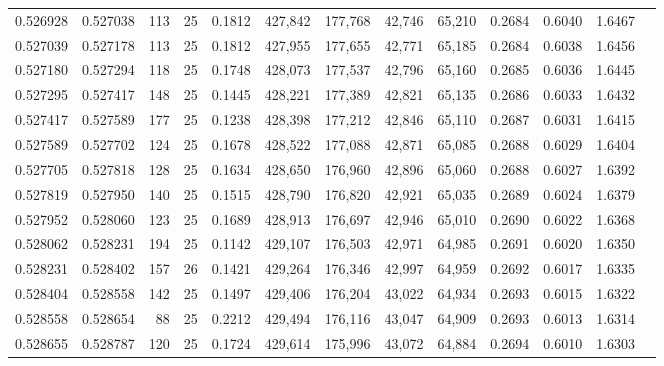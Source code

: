 \begin{tabular}{rrrrrrrrrrrrr}
0.526928 & 0.527038 &   113 &  25 &                                     0.1812 & 427,842 & 177,768 &  42,746 &  65,210 & 0.2684 & 0.6040 & 1.6467 \\
0.527039 & 0.527178 &   113 &  25 &                                     0.1812 & 427,955 & 177,655 &  42,771 &  65,185 & 0.2684 & 0.6038 & 1.6456 \\
0.527180 & 0.527294 &   118 &  25 &                                     0.1748 & 428,073 & 177,537 &  42,796 &  65,160 & 0.2685 & 0.6036 & 1.6445 \\
0.527295 & 0.527417 &   148 &  25 &                                     0.1445 & 428,221 & 177,389 &  42,821 &  65,135 & 0.2686 & 0.6033 & 1.6432 \\
0.527417 & 0.527589 &   177 &  25 &                                     0.1238 & 428,398 & 177,212 &  42,846 &  65,110 & 0.2687 & 0.6031 & 1.6415 \\
0.527589 & 0.527702 &   124 &  25 &                                     0.1678 & 428,522 & 177,088 &  42,871 &  65,085 & 0.2688 & 0.6029 & 1.6404 \\
0.527705 & 0.527818 &   128 &  25 &                                     0.1634 & 428,650 & 176,960 &  42,896 &  65,060 & 0.2688 & 0.6027 & 1.6392 \\
0.527819 & 0.527950 &   140 &  25 &                                     0.1515 & 428,790 & 176,820 &  42,921 &  65,035 & 0.2689 & 0.6024 & 1.6379 \\
0.527952 & 0.528060 &   123 &  25 &                                     0.1689 & 428,913 & 176,697 &  42,946 &  65,010 & 0.2690 & 0.6022 & 1.6368 \\
0.528062 & 0.528231 &   194 &  25 &                                     0.1142 & 429,107 & 176,503 &  42,971 &  64,985 & 0.2691 & 0.6020 & 1.6350 \\
0.528231 & 0.528402 &   157 &  26 &                                     0.1421 & 429,264 & 176,346 &  42,997 &  64,959 & 0.2692 & 0.6017 & 1.6335 \\
0.528404 & 0.528558 &   142 &  25 &                                     0.1497 & 429,406 & 176,204 &  43,022 &  64,934 & 0.2693 & 0.6015 & 1.6322 \\
0.528558 & 0.528654 &    88 &  25 &                                     0.2212 & 429,494 & 176,116 &  43,047 &  64,909 & 0.2693 & 0.6013 & 1.6314 \\
0.528655 & 0.528787 &   120 &  25 &                                     0.1724 & 429,614 & 175,996 &  43,072 &  64,884 & 0.2694 & 0.6010 & 1.6303 \\

\end{tabular}
